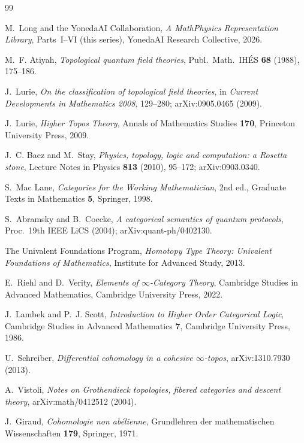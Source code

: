 \documentclass[12pt]{article}
\theoremstyle{definition}
\theoremstyle{remark}
\newcommand{\MtoP}{Math\textrightarrow{}Physics}
\begin{document}
\begin{thebibliography}{99}

 M.~Long and the YonedaAI Collaboration, \emph{A \MtoP{}
Representation Library}, Parts~I--VI (this series), YonedaAI Research Collective, 2026.

 M.~F. Atiyah, \emph{Topological quantum field theories},
Publ.\ Math.\ IH\'ES \textbf{68} (1988), 175--186.

 J.~Lurie, \emph{On the classification of topological field
theories}, in \emph{Current Developments in Mathematics 2008}, 129--280;
arXiv:0905.0465 (2009).

 J.~Lurie, \emph{Higher Topos Theory}, Annals of Mathematics
Studies \textbf{170}, Princeton University Press, 2009.

 J.~C. Baez and M.~Stay, \emph{Physics, topology, logic and
computation: a Rosetta stone}, Lecture Notes in Physics \textbf{813} (2010), 95--172;
arXiv:0903.0340.

 S.~Mac Lane, \emph{Categories for the Working Mathematician},
2nd ed., Graduate Texts in Mathematics \textbf{5}, Springer, 1998.

 S.~Abramsky and B.~Coecke, \emph{A categorical semantics
of quantum protocols}, Proc.\ 19th IEEE LiCS (2004); arXiv:quant-ph/0402130.

 The Univalent Foundations Program, \emph{Homotopy Type Theory:
Univalent Foundations of Mathematics}, Institute for Advanced Study, 2013.

 E.~Riehl and D.~Verity, \emph{Elements of $\infty$-Category
Theory}, Cambridge Studies in Advanced Mathematics, Cambridge University Press, 2022.

 J.~Lambek and P.~J. Scott, \emph{Introduction to Higher
Order Categorical Logic}, Cambridge Studies in Advanced Mathematics \textbf{7},
Cambridge University Press, 1986.

 U.~Schreiber, \emph{Differential cohomology in a cohesive
$\infty$-topos}, arXiv:1310.7930 (2013).

 A.~Vistoli, \emph{Notes on Grothendieck topologies, fibered
categories and descent theory}, arXiv:math/0412512 (2004).

 J.~Giraud, \emph{Cohomologie non ab\'elienne}, Grundlehren der
mathematischen Wissenschaften \textbf{179}, Springer, 1971.


\end{thebibliography}
\end{document}
